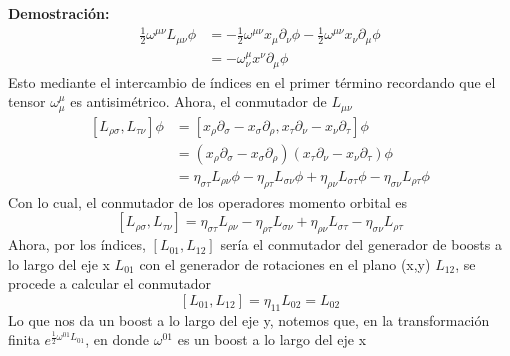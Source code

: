 \documentclass[../main.tex]{subfiles}
\begin{document}
\textbf{Demostración:} \\
\begin{align*}
  \frac{1}{2}\omega^{\mu \nu} L_{\mu \nu} \phi & = -\frac{1}{2}\omega^{\mu \nu} x_\mu \partial_\nu \phi - \frac{1}{2}\omega^{\mu \nu}x_\nu \partial_\mu \phi \\
  & = -\omega^\mu_\nu x^\nu \partial_\mu \phi
\end{align*}
Esto mediante el intercambio de índices en el primer término recordando que el tensor $\omega^{\mu}_\mu$ es antisimétrico.
Ahora, el conmutador de $L_{\mu \nu}$
\begin{align*}
  \left[ L_{\rho \sigma},L_{\tau \nu} \right]\phi & = \left[ x_\rho \partial_\sigma - x_\sigma \partial_\rho , x_\tau \partial_\nu - x_\nu \partial_\tau \right]\phi \\
  & = \left( x_\rho \partial_\sigma - x_\sigma\partial_\rho \right)\left( x_\tau \partial_\nu - x_\nu \partial_\tau \right)\phi \\
  & = \eta_{\sigma \tau }L_{\rho \nu}\phi - \eta_{\rho \tau}L_{\sigma \nu}\phi + \eta_{\rho \nu}L_{\sigma \tau}\phi - \eta_{\sigma \nu}L_{\rho \tau}\phi
\end{align*}
Con lo cual, el conmutador de los operadores momento orbital es
\begin{equation}
  \left[ L_{\rho \sigma}, L_{\tau \nu} \right] = \eta_{\sigma \tau} L_{\rho \nu} - \eta_{\rho \tau}L_{\sigma \nu} + \eta_{\rho \nu} L_{\sigma \tau} - \eta_{\sigma \nu}L_{\rho \tau}
\end{equation}
Ahora, por los índices, $[L_{01},L_{12}]$ sería el conmutador del generador de boosts a lo largo del eje x $L_{01}$ con el generador de rotaciones en el plano (x,y) $L_{12}$, se procede a calcular el conmutador
\begin{equation*}
  \left[ L_{01},L_{12} \right] = \eta_{11}L_{02} = L_{02}
\end{equation*}
Lo que nos da un boost a lo largo del eje y, notemos que, en la transformación finita $e^{\frac{1}{2}\omega^{01}L_{01}}$, en donde $\omega^{01}$ es un boost a lo largo del eje x
\end{document}
